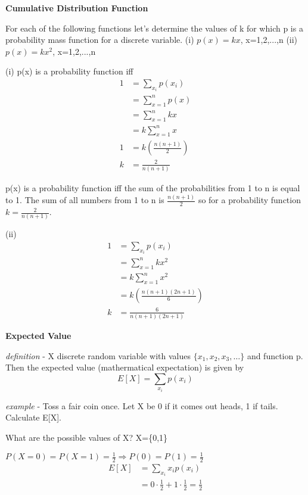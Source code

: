 \documentclass{letter}
\newcommand{\tmtextrm}[1]{{\rmfamily{#1}}}
\newcommand{\tmtextsf}[1]{{\sffamily{#1}}}
\newcommand{\tmtexttt}[1]{{\ttfamily{#1}}}
\begin{document}
\tmtexttt{\tmtextsf{\tmtextrm{}}}

\textbf{Cumulative Distribution Function}

For each of the following functions let's determine the values of k for which
p is a probability mass function for a discrete variable.\newline
(i) $p(x) = kx$, x=1,2,...,n\newline
(ii) $p(x) = kx^2$, x=1,2,...,n\newline


(i) p(x) is a probability function iff
\begin{align*}
1 & = \sum_{x_i} p (x_i)\\
& = \sum^n_{x = 1} p (x)\\
& = \sum_{x = 1}^n kx\\
& = k \sum_{x = 1}^n x\\
1 & = k \left( \frac{n (n + 1)}{2}\right) \\
k & = \frac{2}{n (n + 1)}
\end{align*}

p(x) is a probability function iff the sum of the probabilities from 1 to n is
equal to 1. The sum of all numbers from 1 to n is $\frac{n (n + 1)}{2}$ so for a
probability function $k = \frac{2}{n (n + 1)}$.

(ii)
\begin{align*}
1 & = \sum_{x_i} p(x_i)\\
& = \sum_{x = 1}^n kx^2\\
& = k \sum_{x = 1}^n x^2\\
& = k\left(\frac{n (n + 1)(2 n + 1)}{6}\right)\\
k & = \frac{6}{n (n + 1) (2 n + 1)}
\end{align*}
\pagebreak

\textbf{Expected Value}

\emph{definition} - X discrete random variable with values $\{x_1, x_2, x_3,
\ldots\}$ and function p. Then the expected value (mathermatical expectation)
is given by
\[ E [X] = \sum_{x_i} p (x_i) \]


\emph{example} - Toss a fair coin once. Let X be 0 if it comes out heads, 1 if tails.
Calculate E[X].

What are the possible values of X? X=\{0,1\}

$P (X = 0) = P (X = 1) = \frac{1}{2}
\Rightarrow P (0) = P (1) = \frac{1}{2}$
\begin{align*}
E [X] & = \sum_{x_i} x_i p (x_i)\\
& = 0 \cdot \frac{1}{2} + 1 \cdot \frac{1}{2} = \frac{1}{2}
\end{align*}
\end{document}
